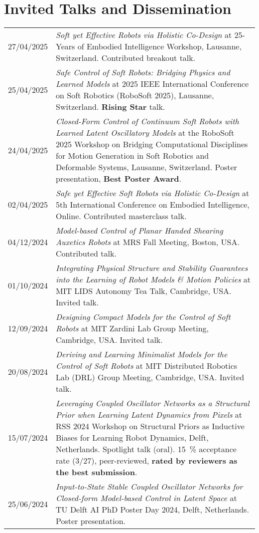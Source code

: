 \section*{Invited Talks and Dissemination}
\noindent
\begin{longtable}{p{} p{}}
    27/04/2025 & \emph{Soft yet Effective Robots via Holistic Co-Design} at 25-Years of Embodied Intelligence Workshop, Lausanne, Switzerland. Contributed breakout talk.\\
    25/04/2025 & \emph{Safe Control of Soft Robots: Bridging Physics and Learned Models} at 2025 IEEE International Conference on Soft Robotics (RoboSoft 2025), Lausanne, Switzerland. \textbf{Rising Star} talk.\\
    24/04/2025 & \emph{Closed-Form Control of Continuum Soft Robots with Learned Latent Oscillatory Models} at the RoboSoft 2025 Workshop on Bridging Computational Disciplines for Motion Generation in Soft Robotics and Deformable Systems, Lausanne, Switzerland. Poster presentation, \textbf{Best Poster Award}.\\
    02/04/2025 & \emph{Safe yet Effective Soft Robots via Holistic Co-Design} at 5th International Conference on Embodied Intelligence, Online. Contributed masterclass talk.\\
    04/12/2024 & \emph{Model-based Control of Planar Handed Shearing Auxetics Robots} at MRS Fall Meeting, Boston, USA. Contributed talk.\\
    01/10/2024 & \emph{Integrating Physical Structure and Stability Guarantees into the Learning of Robot Models \& Motion Policies} at MIT LIDS Autonomy Tea Talk, Cambridge, USA. Invited talk.\\
    12/09/2024 & \emph{Designing Compact Models for the Control of Soft Robots} at MIT Zardini Lab Group Meeting, Cambridge, USA. Invited talk.\\
    20/08/2024 & \emph{Deriving and Learning Minimalist Models for the Control of Soft Robots} at MIT Distributed Robotics Lab (DRL) Group Meeting, Cambridge, USA. Invited talk.\\
    15/07/2024 & \emph{Leveraging Coupled Oscillator Networks as a Structural Prior when Learning Latent Dynamics from Pixels} at RSS 2024 Workshop on Structural Priors as Inductive Biases for
    Learning Robot Dynamics, Delft, Netherlands. Spotlight talk (oral). \SI{15}{\percent} acceptance rate (3/27), peer-reviewed, \textbf{rated by reviewers as the best submission}.\\
    25/06/2024 & \emph{Input-to-State Stable Coupled Oscillator Networks for Closed-form Model-based Control in Latent Space} at TU Delft AI PhD Poster Day 2024, Delft, Netherlands. Poster presentation.\\

\end{longtable}
